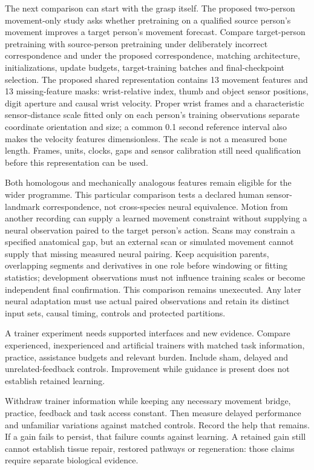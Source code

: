 The next comparison can start with the grasp itself. The proposed two-person movement-only study asks whether pretraining on a qualified source person's movement improves a target person's movement forecast. Compare target-person pretraining with source-person pretraining under deliberately incorrect correspondence and under the proposed correspondence, matching architecture, initializations, update budgets, target-training batches and final-checkpoint selection. The proposed shared representation contains 13 movement features and 13 missing-feature masks: wrist-relative index, thumb and object sensor positions, digit aperture and causal wrist velocity. Proper wrist frames and a characteristic sensor-distance scale fitted only on each person's training observations separate coordinate orientation and size; a common 0.1 second reference interval also makes the velocity features dimensionless. The scale is not a measured bone length. Frames, units, clocks, gaps and sensor calibration still need qualification before this representation can be used.\par

Both homologous and mechanically analogous features remain eligible for the wider programme. This particular comparison tests a declared human sensor-landmark correspondence, not cross-species neural equivalence. Motion from another recording can supply a learned movement constraint without supplying a neural observation paired to the target person's action. Scans may constrain a specified anatomical gap, but an external scan or simulated movement cannot supply that missing measured neural pairing. Keep acquisition parents, overlapping segments and derivatives in one role before windowing or fitting statistics; development observations must not influence training scales or become independent final confirmation. This comparison remains unexecuted. Any later neural adaptation must use actual paired observations and retain its distinct input sets, causal timing, controls and protected partitions.\par

A trainer experiment needs supported interfaces and new evidence. Compare experienced, inexperienced and artificial trainers with matched task information, practice, assistance budgets and relevant burden. Include sham, delayed and unrelated-feedback controls. Improvement while guidance is present does not establish retained learning.\par

Withdraw trainer information while keeping any necessary movement bridge, practice, feedback and task access constant. Then measure delayed performance and unfamiliar variations against matched controls. Record the help that remains. If a gain fails to persist, that failure counts against learning. A retained gain still cannot establish tissue repair, restored pathways or regeneration: those claims require separate biological evidence.\par

